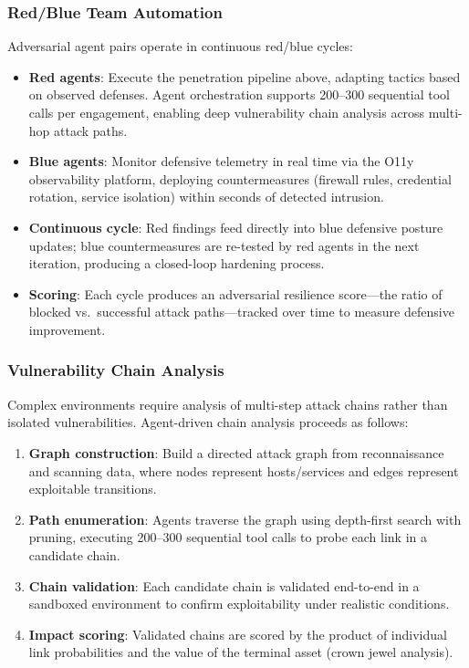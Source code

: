 \documentclass[11pt,letterpaper]{article}
\begin{document}
\subsubsection{Red/Blue Team Automation}

Adversarial agent pairs operate in continuous red/blue cycles:

\begin{itemize}
\item \textbf{Red agents}: Execute the penetration pipeline above, adapting tactics based on observed defenses. Agent orchestration supports 200--300 sequential tool calls per engagement, enabling deep vulnerability chain analysis across multi-hop attack paths.
\item \textbf{Blue agents}: Monitor defensive telemetry in real time via the O11y observability platform, deploying countermeasures (firewall rules, credential rotation, service isolation) within seconds of detected intrusion.
\item \textbf{Continuous cycle}: Red findings feed directly into blue defensive posture updates; blue countermeasures are re-tested by red agents in the next iteration, producing a closed-loop hardening process.
\item \textbf{Scoring}: Each cycle produces an adversarial resilience score---the ratio of blocked vs.\ successful attack paths---tracked over time to measure defensive improvement.
\end{itemize}

\subsubsection{Vulnerability Chain Analysis}

Complex environments require analysis of multi-step attack chains rather than isolated vulnerabilities. Agent-driven chain analysis proceeds as follows:

\begin{enumerate}
\item \textbf{Graph construction}: Build a directed attack graph from reconnaissance and scanning data, where nodes represent hosts/services and edges represent exploitable transitions.
\item \textbf{Path enumeration}: Agents traverse the graph using depth-first search with pruning, executing 200--300 sequential tool calls to probe each link in a candidate chain.
\item \textbf{Chain validation}: Each candidate chain is validated end-to-end in a sandboxed environment to confirm exploitability under realistic conditions.
\item \textbf{Impact scoring}: Validated chains are scored by the product of individual link probabilities and the value of the terminal asset (crown jewel analysis).
\end{enumerate}
\end{document}
